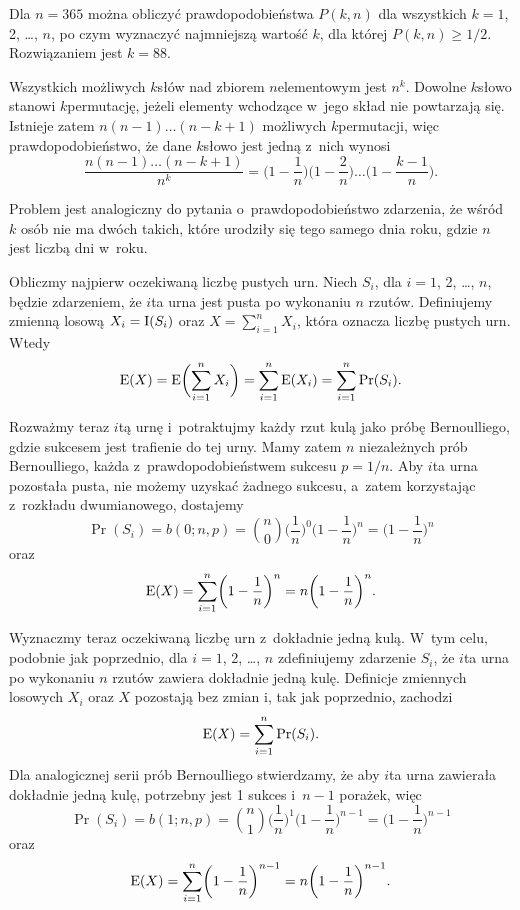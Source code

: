Dla $n=365$ można obliczyć prawdopodobieństwa $P(k,n)$ dla wszystkich $k=1$, 2, \dots, $n$, po czym wyznaczyć najmniejszą wartość $k$, dla której $P(k,n)\ge1/2$.
Rozwiązaniem jest $k=88$.

\exercise %
Wszystkich możliwych $k$\nbhyphen słów nad zbiorem $n$\nbhyphen elementowym jest $n^k$.
Dowolne $k$\nbhyphen słowo stanowi $k$\nbhyphen permutację, jeżeli elementy wchodzące w~jego skład nie powtarzają się.
Istnieje zatem $n(n-1)\dots(n-k+1)$ możliwych $k$\nbhyphen permutacji, więc prawdopodobieństwo, że dane $k$\nbhyphen słowo jest jedną z~nich wynosi
\[
	\frac{n(n-1)\dots(n-k+1)}{n^k} = \biggl(1-\frac{1}{n}\biggr)\biggl(1-\frac{2}{n}\biggr)\dots\biggl(1-\frac{k-1}{n}\biggr).
\]

Problem jest analogiczny do pytania o~prawdopodobieństwo zdarzenia, że wśród $k$ osób nie ma dwóch takich, które urodziły się tego samego dnia roku, gdzie $n$ jest liczbą dni w~roku.

\exercise %
Obliczmy najpierw oczekiwaną liczbę pustych urn.
Niech $S_i$, dla $i=1$, 2, \dots, $n$, będzie zdarzeniem, że $i$\nbhyphen ta urna jest pusta po wykonaniu $n$ rzutów.
Definiujemy zmienną losową $X_i=\operatorname{I}(S_i)$ oraz $X=\sum_{i=1}^nX_i$, która oznacza liczbę pustych urn.
Wtedy
\[
	\operatorname{E}(X) = \operatorname{E}\biggl(\sum_{i=1}^nX_i\biggr) = \sum_{i=1}^n\operatorname{E}(X_i) = \sum_{i=1}^n\Pr(S_i).
\]

Rozważmy teraz $i$\nbhyphen tą urnę i~potraktujmy każdy rzut kulą jako próbę Bernoulliego, gdzie sukcesem jest trafienie do tej urny.
Mamy zatem $n$ niezależnych prób Bernoulliego, każda z~prawdopodobieństwem sukcesu $p=1/n$.
Aby $i$\nbhyphen ta urna pozostała pusta, nie możemy uzyskać żadnego sukcesu, a~zatem korzystając z~rozkładu dwumianowego, dostajemy
\[
	\Pr(S_i) = b(0;n,p) = \binom{n}{0}\biggl(\frac{1}{n}\biggr)^0\biggl(1-\frac{1}{n}\biggr)^n = \biggl(1-\frac{1}{n}\biggr)^n
\]
oraz
\[
	\operatorname{E}(X) = \sum_{i=1}^n\biggl(1-\frac{1}{n}\biggr)^n = n\biggl(1-\frac{1}{n}\biggr)^n.
\]

Wyznaczmy teraz oczekiwaną liczbę urn z~dokładnie jedną kulą.
W~tym celu, podobnie jak poprzednio, dla $i=1$, 2, \dots, $n$ zdefiniujemy zdarzenie $S_i$, że $i$\nbhyphen ta urna po wykonaniu $n$ rzutów zawiera dokładnie jedną kulę.
Definicje zmiennych losowych $X_i$ oraz $X$ pozostają bez zmian i, tak jak poprzednio, zachodzi
\[
	\operatorname{E}(X) = \sum_{i=1}^n\Pr(S_i).
\]
Dla analogicznej serii prób Bernoulliego stwierdzamy, że aby $i$\nbhyphen ta urna zawierała dokładnie jedną kulę, potrzebny jest 1 sukces i~$n-1$ porażek, więc
\[
	\Pr(S_i) = b(1;n,p) = \binom{n}{1}\biggl(\frac{1}{n}\biggr)^1\biggl(1-\frac{1}{n}\biggr)^{n-1} = \biggl(1-\frac{1}{n}\biggr)^{n-1}
\]
oraz
\[
	\operatorname{E}(X) = \sum_{i=1}^n\biggl(1-\frac{1}{n}\biggr)^{n-1} = n\biggl(1-\frac{1}{n}\biggr)^{n-1}.
\]

